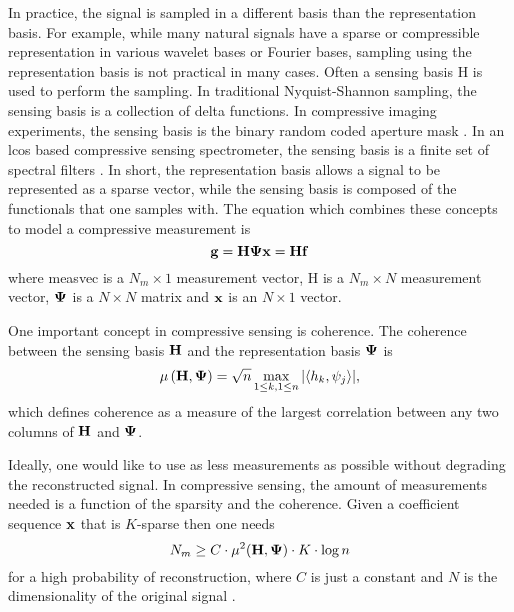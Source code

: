 In practice, the signal is sampled in a different basis than the representation basis. For example, while many natural signals have a sparse or compressible representation in various wavelet bases or Fourier bases, sampling using the representation basis is not practical in many cases. Often a sensing basis \gls{H} is used to perform the sampling. In traditional Nyquist-Shannon sampling, the sensing basis is a collection of delta functions. In \gls{compressive imaging} experiments, the sensing basis is the binary random coded aperture mask \cite{duarte2008single}. In an \gls{lcos} based compressive sensing spectrometer, the sensing basis is a finite set of spectral filters \cite{oiknine2016along, yuan2015compressive}. In short, the representation basis allows a signal to be represented as a sparse vector, while the sensing basis is composed of the functionals that one samples with. The equation which combines these concepts to model a compressive measurement is
%
\begin{equation}
	\mathbf{g} = \mathbf{H} \mathbf{\Psi} \mathbf{x} = \mathbf{H} \mathbf{f}
	\label{eq:gHf2}
\end{equation}
%
where \gls{measvec} is a $N_m \times 1$ measurement vector, \gls{H} is a $N_m \times N$ measurement vector, $\mathbf{\Psi}$ is a $N \times N$ matrix and $\mathbf{x}$ is an $N \times 1$ vector. 

One important concept in \gls{compressive sensing} is coherence. The coherence between the sensing basis $\mathbf{H}$ and the representation basis $\mathbf{\Psi}$ is
\begin{equation}
	\mu \left( \mathbf{H}, \mathbf{\Psi} \right) = \sqrt{n} \max_{1 \leq k, 1 \leq n}  | \langle h_k, \psi_j \rangle | ,
	\label{eq:coherenceDef1}
\end{equation}
which defines coherence as a measure of the largest correlation between any two columns of $\mathbf{H}$ and $\mathbf{\Psi}$. 

Ideally, one would like to use as less measurements as possible without degrading the reconstructed signal. In \gls{compressive sensing}, the amount of measurements needed is a function of the sparsity and the coherence. Given a coefficient sequence $\mathbf{x}$ that is $K$-sparse then one needs
\begin{equation}
N_m \geq C \cdot \mu^2 ( \mathbf{H} , \mathbf{\Psi} ) \cdot K \cdot \log n
\label{eq:minMeas1}
\end{equation}
for a high probability of reconstruction, where $C$ is just a constant and $N$ is the dimensionality of the original signal \cite{candes2008introduction}.

